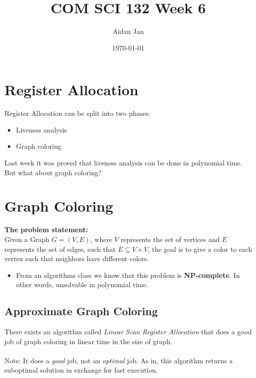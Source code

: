 \documentclass[10pt]{article}
\title{COM SCI 132 Week 6}
\author{Aidan Jan}
\date{\today}
\begin{document}
\section*{Register Allocation}
Register Allocation can be split into two phases:
\begin{itemize}
    \item Liveness analysis
    \item Graph coloring
\end{itemize}
Last week it was proved that liveness analysis can be done in polynomial time.  But what about graph coloring?

\section*{Graph Coloring}
\textbf{The problem statement:}\\
Given a Graph $G = (V, E)$, where $V$ represents the set of vertices and $E$ represents the set of edges, such that $E \subseteq V \times V$, the goal is to give a color to each vertex such that neighbors have different colors.
\begin{itemize}
    \item From an algorithms class we know that this problem is \textbf{NP-complete}.  In other words, unsolvable in polynomial time.
\end{itemize}

\subsection*{Approximate Graph Coloring}
There exists an algorithm called \textit{Linear Scan Register Allocation} that does a good job of graph coloring in linear time in the size of graph.\\\\
Note: It does a \textit{good} job, not an \textit{optimal} job.  As in, this algorithm returns a suboptimal solution in exchange for fast execution.
\end{document}
